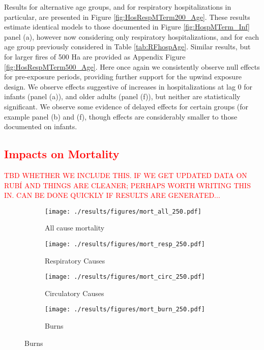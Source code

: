 \documentclass[11pt]{article}
\begin{document}
\begin{spacing}{1.5}
Results for alternative age groups, and for respiratory hospitalizations in particular, are presented in Figure \ref{fig:HosRespMTerm200_Age}.  These results estimate identical models to those documented in Figure \ref{fig:HospMTerm_Inf} panel (a), however now considering only respiratory hospitalizations, and for each age group previously considered in Table \ref{tab:RFhospAge}.  Similar results, but for larger fires of 500 Ha are provided as Appendix Figure \ref{fig:HosRespMTerm500_Age}. 
Here once again we consistently observe null effects for pre-exposure periods, providing further support for the upwind exposure design.  We observe effects suggestive of increases in hospitalizations at lag 0 for infants (panel (a)), and older adults (panel (f)), but neither are statistically significant.  We observe some evidence of delayed effects for certain groups (for example panel (b) and (f), though effects are considerably smaller to those documented on infants.

\subsection{\textcolor{red}{Impacts on Mortality}}
\textcolor{red}{TBD WHETHER WE INCLUDE THIS.  IF WE GET UPDATED DATA ON RUBÍ AND THINGS ARE CLEANER; PERHAPS WORTH WRITING THIS IN.  CAN BE DONE QUICKLY IF RESULTS ARE GENERATED...}
\begin{figure}[htpb!]
    \centering
 \label{fig:mortAll}
    \caption{Impacts of Fire Exposure (Upwind) on Age-Specific Mortality Rate, by Cause}    \label{fig:mortRF_byAge_types}
    \begin{subfigure}{0.49\textwidth}
    \centering
   \texttt{[image: ./results/figures/mort\_all\_250.pdf]}
    \caption{All cause mortality}
    \end{subfigure}    
    \begin{subfigure}{0.49\textwidth}
    \centering
    \texttt{[image: ./results/figures/mort\_resp\_250.pdf]}
    \caption{Respiratory Causes}
    \end{subfigure}    
    \begin{subfigure}{0.49\textwidth}
    \centering
    \texttt{[image: ./results/figures/mort\_circ\_250.pdf]}
    \caption{Circulatory Causes}
    \end{subfigure}    
    \begin{subfigure}{0.49\textwidth}
    \centering
    \texttt{[image: ./results/figures/mort\_burn\_250.pdf]}
    \caption{Burns}
    \end{subfigure}    
\end{figure}
\clearpage



\end{spacing}
\end{document}
